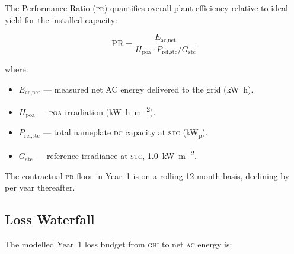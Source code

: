 The Performance Ratio (\textsc{pr}) quantifies overall plant efficiency relative to ideal
yield for the installed capacity:

\[
  \text{PR} = \frac{E_{\text{ac,net}}}{H_{\text{poa}} \cdot P_{\text{ref,stc}} / G_{\text{stc}}}
\]

where:
\begin{itemize}[leftmargin=1.6em, itemsep=2pt]
  \item $E_{\text{ac,net}}$ — measured net AC energy delivered to the grid (\si{\kilo\watt\hour}).
  \item $H_{\text{poa}}$ — \textsc{poa} irradiation (\si{\kilo\watt\hour\per\meter\squared}).
  \item $P_{\text{ref,stc}}$ — total nameplate \textsc{dc} capacity at \textsc{stc} (\si{\kilo\watt_p}).
  \item $G_{\text{stc}}$ — reference irradiance at \textsc{stc}, \SI{1.0}{\kilo\watt\per\meter\squared}.
\end{itemize}

The contractual \textsc{pr} floor in Year~1 is  on a rolling
12-month basis, declining by  per year thereafter.

\subsection{Loss Waterfall}

The modelled Year~1 loss budget from \textsc{ghi} to net \textsc{ac} energy is:


